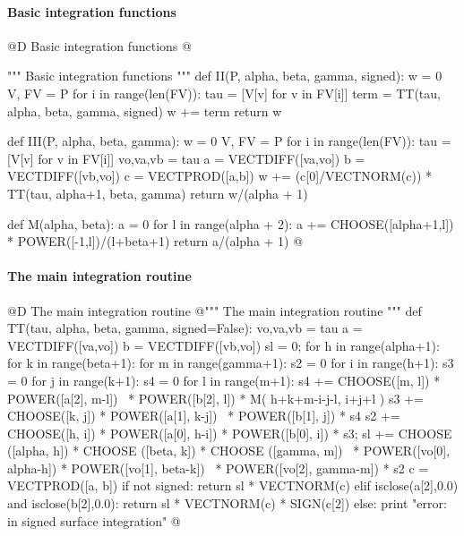 \documentclass[11pt,oneside]{article}	%
\begin{document}
\paragraph{Basic integration functions}
@D Basic integration functions
@{""" Basic integration functions """
def II(P, alpha, beta, gamma, signed):
    w = 0
    V, FV = P
    for i in range(len(FV)):
        tau = [V[v] for v in FV[i]]
        term = TT(tau, alpha, beta, gamma, signed)
        w += term
    return w

def III(P, alpha, beta, gamma):
    w = 0
    V, FV = P
    for i in range(len(FV)):
        tau = [V[v] for v in FV[i]]
        vo,va,vb = tau
        a = VECTDIFF([va,vo])
        b = VECTDIFF([vb,vo])
        c = VECTPROD([a,b])
        w += (c[0]/VECTNORM(c)) * TT(tau, alpha+1, beta, gamma)
    return w/(alpha + 1)

def M(alpha, beta):
    a = 0
    for l in range(alpha + 2):
        a += CHOOSE([alpha+1,l]) * POWER([-1,l])/(l+beta+1)
    return a/(alpha + 1)
@}



\paragraph{The main integration routine}
@D The main integration routine
@{""" The main integration routine """
def TT(tau, alpha, beta, gamma, signed=False):
	vo,va,vb = tau
	a = VECTDIFF([va,vo])
	b = VECTDIFF([vb,vo])
	sl = 0;
	for h in range(alpha+1):
		for k in range(beta+1):
			for m in range(gamma+1):
				s2 = 0
				for i in range(h+1): 
					s3 = 0
					for j in range(k+1):
						s4 = 0
						for l in range(m+1):
							s4 += CHOOSE([m, l]) * POWER([a[2], m-l]) \
								* POWER([b[2], l]) * M( h+k+m-i-j-l, i+j+l )
						s3 += CHOOSE([k, j]) * POWER([a[1], k-j]) \
							* POWER([b[1], j]) * s4
					s2 += CHOOSE([h, i]) * POWER([a[0], h-i]) * POWER([b[0], i]) * s3;
				sl += CHOOSE ([alpha, h]) * CHOOSE ([beta, k]) * CHOOSE ([gamma, m]) \
					* POWER([vo[0], alpha-h]) * POWER([vo[1], beta-k]) \
					* POWER([vo[2], gamma-m]) * s2
	c = VECTPROD([a, b])
	if not signed: return sl * VECTNORM(c)
	elif isclose(a[2],0.0) and isclose(b[2],0.0):
		return sl * VECTNORM(c) * SIGN(c[2])
	else: print "error: in signed surface integration"
@}
\end{document}
